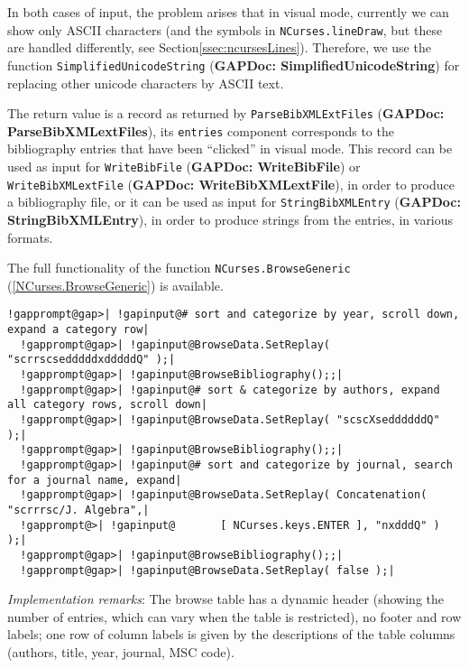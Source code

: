 \documentclass[a4paper,11pt]{report}
\begin{document}
{{{ In both cases of input, the problem arises that in visual mode, currently we
can show only ASCII characters (and the symbols in \texttt{NCurses.lineDraw}, but these are handled differently, see Section{\nobreakspace}\ref{ssec:ncursesLines}). Therefore, we use the function \texttt{SimplifiedUnicodeString} (\textbf{GAPDoc: SimplifiedUnicodeString}) for replacing other unicode characters by ASCII text. 

 The return value is a record as returned by \texttt{ParseBibXMLExtFiles} (\textbf{GAPDoc: ParseBibXMLextFiles}), its \texttt{entries} component corresponds to the bibliography entries that have been ``clicked'' in visual mode. This record can be used as input for \texttt{WriteBibFile} (\textbf{GAPDoc: WriteBibFile}) or \texttt{WriteBibXMLextFile} (\textbf{GAPDoc: WriteBibXMLextFile}), in order to produce a bibliography file, or it can be used as input for \texttt{StringBibXMLEntry} (\textbf{GAPDoc: StringBibXMLEntry}), in order to produce strings from the entries, in various formats. 

 The full functionality of the function \texttt{NCurses.BrowseGeneric} (\ref{NCurses.BrowseGeneric}) is available. 

 
\begin{Verbatim}[commandchars=!@|,fontsize=\small,frame=single,label=Example]
  !gapprompt@gap>| !gapinput@# sort and categorize by year, scroll down, expand a category row|
  !gapprompt@gap>| !gapinput@BrowseData.SetReplay( "scrrscsedddddxdddddQ" );|
  !gapprompt@gap>| !gapinput@BrowseBibliography();;|
  !gapprompt@gap>| !gapinput@# sort & categorize by authors, expand all category rows, scroll down|
  !gapprompt@gap>| !gapinput@BrowseData.SetReplay( "scscXseddddddQ" );|
  !gapprompt@gap>| !gapinput@BrowseBibliography();;|
  !gapprompt@gap>| !gapinput@# sort and categorize by journal, search for a journal name, expand|
  !gapprompt@gap>| !gapinput@BrowseData.SetReplay( Concatenation( "scrrrsc/J. Algebra",|
  !gapprompt@>| !gapinput@       [ NCurses.keys.ENTER ], "nxdddQ" ) );|
  !gapprompt@gap>| !gapinput@BrowseBibliography();;|
  !gapprompt@gap>| !gapinput@BrowseData.SetReplay( false );|
\end{Verbatim}
 

 \emph{Implementation remarks}: The browse table has a dynamic header (showing the number of entries, which
can vary when the table is restricted), no footer and row labels; one row of
column labels is given by the descriptions of the table columns (authors,
title, year, journal, MSC code). 

}}}
\end{document}
